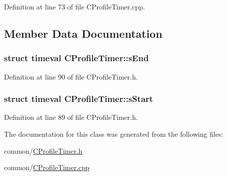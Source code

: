\-Definition at line 73 of file \-C\-Profile\-Timer.\-cpp.



\subsection{\-Member \-Data \-Documentation}
\hypertarget{class_c_profile_timer_ac51e8e2333d5c218d86414a25d55f224}{
\subsubsection[{s\-End}]{\setlength{\rightskip}{0pt plus 5cm}struct timeval {\bf \-C\-Profile\-Timer\-::s\-End}}}\label{class_c_profile_timer_ac51e8e2333d5c218d86414a25d55f224}


\-Definition at line 90 of file \-C\-Profile\-Timer.\-h.

\hypertarget{class_c_profile_timer_a4c80bee9e1f0f119a091f46888507b99}{
\subsubsection[{s\-Start}]{\setlength{\rightskip}{0pt plus 5cm}struct timeval {\bf \-C\-Profile\-Timer\-::s\-Start}}}\label{class_c_profile_timer_a4c80bee9e1f0f119a091f46888507b99}


\-Definition at line 89 of file \-C\-Profile\-Timer.\-h.



\-The documentation for this class was generated from the following files\-:\begin{DoxyCompactItemize}
\item 
common/\hyperlink{_c_profile_timer_8h}{\-C\-Profile\-Timer.\-h}\item 
common/\hyperlink{_c_profile_timer_8cpp}{\-C\-Profile\-Timer.\-cpp}\end{DoxyCompactItemize}
